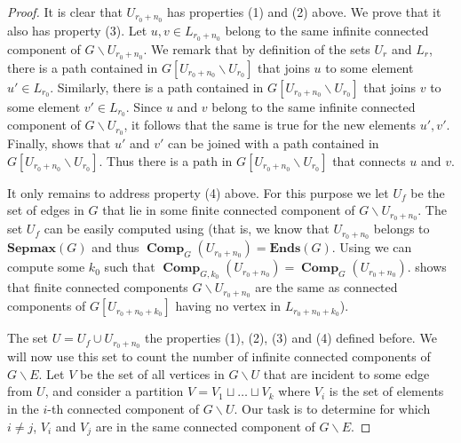 \documentclass[10pt,A4]{amsart}
\theoremstyle{definition}
\theoremstyle{definition}
\newcommand{\Ends}[1]{\mathbf{Ends}({#1})}
\newcommand{\sepmax}[1]{\mathbf{Sepmax}({#1})}
\newcommand{\comp}{\operatorname{\mathbf{Comp}}}
\begin{document}
\begin{proof}
    
    It is clear that $U_{r_0+n_0}$ has properties (1) and (2) above. We prove that it also has property (3). Let $u,v\in L_{r_0+n_0}$ belong to the same infinite connected component of $G\smallsetminus U_{r_0+n_0}$. We remark that by definition of the sets $U_r$ and $L_r$, there is a path contained in $G[U_{r_0+n_0}\smallsetminus U_{r_0}]$ that joins $u$ to some element $u'\in L_{r_0}$. Similarly, there is a path contained in $G[U_{r_0+n_0}\smallsetminus U_{r_0}]$ that joins $v$ to some element $v'\in L_{r_0}$. Since $u$ and $v$ belong to the same infinite connected component of $G\smallsetminus U_{r_0}$, it follows that the same is true for the new elements $u',v'$. Finally,  shows that $u'$ and $v'$ can be joined with a path contained in $G[U_{r_0+n_0}\smallsetminus U_{r_0}]$. Thus there is a path in $G[U_{r_0+n_0}\smallsetminus U_{r_0}]$ that connects $u$ and $v$. 
    
    It only remains to address property (4) above. For this purpose we let $U_f$ be the set of edges in $G$ that lie in some finite connected component of $G\smallsetminus U_{r_0+n_0}$. The set $U_f$ can be easily computed using  (that is, we know that  $U_{r_0+n_0}$ belongs to $\sepmax{G}$ and thus $\comp_G(U_{r_0+n_0})=\Ends{G}$. Using  we can compute some $k_0$ such that $\comp_{G,k_0}(U_{r_0+n_0})=\comp_G(U_{r_0+n_0})$.   shows that finite  connected components  $G\smallsetminus U_{r_0+n_0}$ are the same as connected components of $G[U_{r_0+n_0+k_0}]$ having no vertex in $L_{r_0+n_0+k_0}$). 


    
      The set $U=U_f\cup U_{r_0+n_0}$ the properties (1), (2), (3) and (4) defined before. We will now use this set to count the number of infinite connected components of $G\smallsetminus E$. Let $V$ be the set of all vertices in $G\smallsetminus U$ that are incident to some edge from $U$, and consider a partition  $V=V_1\sqcup \dots \sqcup V_k$ where $V_i$ is the set of elements in the $i$-th connected component of $G\smallsetminus U$. Our task is to determine for which $i\ne j$, $V_i$ and $V_j$ are in the same connected component of $G\smallsetminus E$. 
    

\end{proof}
\end{document}
